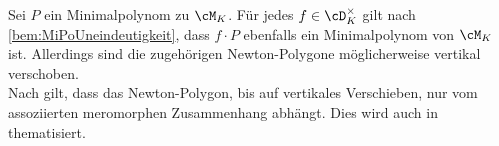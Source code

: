 \begin{defcor}
\begin{comment}
\begin{bem}
Zur vorstellung der Eigenschaft Regulär \dots
\begin{itemize}
\item $P_1=x(x\partial_x+1)$ regulär mit Lösung $\frac{1}{x}$
\item $P_2=x^2\partial_x+1$ irrregulär mit Lösung $e^{\frac{1}{x}}$
\end{itemize}
\end{bem}
\end{comment}

\begin{bem} \label{bem:NPverschieben}
Sei $P$ ein Minimalpolynom zu $\cM_K$.
Für jedes $f\in\cD_K^\times$
gilt nach \ref{bem:MiPoUneindeutigkeit}, dass $f\cdot P$ ebenfalls ein
Minimalpolynom von $\cM_K$ ist.  Allerdings sind die zugehörigen Newton-Polygone
möglicherweise vertikal verschoben.\\
Nach \cite[Seite 25]{sabbah_cimpa90} gilt, dass das Newton-Polygon, bis auf
vertikales Verschieben, nur vom assoziierten meromorphen Zusammenhang abhängt.
Dies wird auch in \cite[Bem 5.4]{ZulaBarbara} thematisiert.
\end{bem}


\end{defcor}
